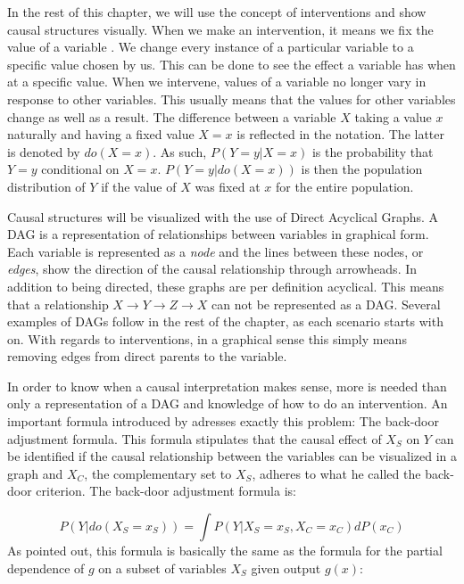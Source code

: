 \documentclass[
]{krantz}
\begin{document}
In the rest of this chapter, we will use the concept of interventions and show causal structures visually. When we make an intervention, it means we fix the value of a variable \citep{pearl1993}. We change every instance of a particular variable to a specific value chosen by us. This can be done to see the effect a variable has when at a specific value. When we intervene, values of a variable no longer vary in response to other variables. This usually means that the values for other variables change as well as a result.
The difference between a variable \(X\) taking a value \(x\) naturally and having a fixed value \(X=x\) is reflected in the notation. The latter is denoted by \(do(X=x)\). As such, \(P(Y=y|X=x)\) is the probability that \(Y=y\) conditional on \(X=x\). \(P(Y=y|do(X=x))\) is then the population distribution of \(Y\) if the value of \(X\) was fixed at \(x\) for the entire population.

Causal structures will be visualized with the use of Direct Acyclical Graphs. A DAG is a representation of relationships between variables in graphical form. Each variable is represented as a \emph{node} and the lines between these nodes, or \emph{edges}, show the direction of the causal relationship through arrowheads. In addition to being directed, these graphs are per definition acyclical. This means that a relationship \(X \rightarrow Y \rightarrow Z \rightarrow X\) can not be represented as a DAG. Several examples of DAGs follow in the rest of the chapter, as each scenario starts with on. With regards to interventions, in a graphical sense this simply means removing edges from direct parents to the variable.

In order to know when a causal interpretation makes sense, more is needed than only a representation of a DAG and knowledge of how to do an intervention. An important formula introduced by \citep{pearl1993} adresses exactly this problem: The back-door adjustment formula. This formula stipulates that the causal effect of \(X_S\) on \(Y\) can be identified if the causal relationship between the variables can be visualized in a graph and \(X_C\), the complementary set to \(X_S\), adheres to what he called the back-door criterion. The back-door adjustment formula is:

\[P(Y|do(X_S = x_S)) = \int P(Y |X_S = x_S, X_C = x_C) dP(x_C)\]
As \citep{zhaohastie} pointed out, this formula is basically the same as the formula for the partial
dependence of \(g\) on a subset of variables \(X_S\) given output \(g(x)\):
\end{document}
